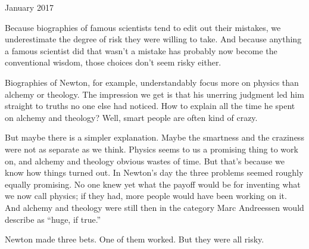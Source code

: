 January 2017

Because biographies of famous scientists tend to edit out their
mistakes, we underestimate the degree of risk they were willing to take.
And because anything a famous scientist did that wasn't a mistake has
probably now become the conventional wisdom, those choices don't seem
risky either.

Biographies of Newton, for example, understandably focus more on physics
than alchemy or theology. The impression we get is that his unerring
judgment led him straight to truths no one else had noticed. How to
explain all the time he spent on alchemy and theology? Well, smart
people are often kind of crazy.

But maybe there is a simpler explanation. Maybe the smartness and the
craziness were not as separate as we think. Physics seems to us a
promising thing to work on, and alchemy and theology obvious wastes of
time. But that's because we know how things turned out. In Newton's day
the three problems seemed roughly equally promising. No one knew yet
what the payoff would be for inventing what we now call physics; if they
had, more people would have been working on it. And alchemy and theology
were still then in the category Marc Andreessen would describe as
``huge, if true.''

Newton made three bets. One of them worked. But they were all risky.
